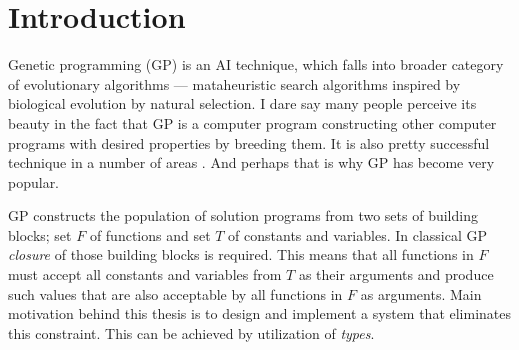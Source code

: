 \documentclass[12pt,a4paper]{report}
\begin{document}
\newpage



\pagestyle{plain}
\setcounter{page}{1}


\tableofcontents
	
\chapter*{Introduction}



Genetic programming (GP) is an AI technique, which falls into broader category 
of evolutionary algorithms  ---  mataheuristic  search algorithms inspired  by 
biological evolution by natural selection. I dare say many people perceive its beauty in the  fact that GP is a computer program  constructing other computer programs %
with desired properties by breeding them. 
It is also pretty successful technique in a number of areas \cite{koza05}. 
And perhaps that is why GP has become very popular.    

GP constructs the population of solution programs from 
two sets of building blocks; set $F$ of functions 
and set $T$ of constants and variables. 
In classical GP \textit{closure} of those 
building blocks is required.
This means that all functions in $F$ must accept all 
constants and variables from $T$ as their arguments and produce 
such values that are also acceptable by all functions in $F$ as arguments.
Main motivation behind this thesis is to design and implement a system that
eliminates this constraint. 
This can be achieved by utilization of \textit{types}.\\
\end{document}
